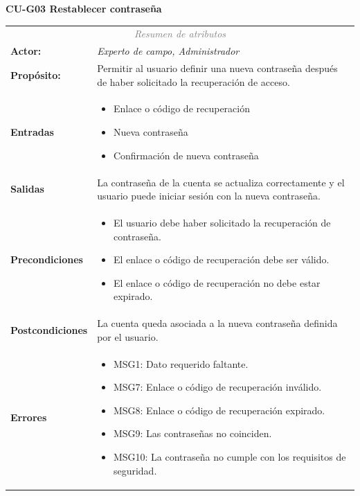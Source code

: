 \textbf{CU-G03 Restablecer contraseña}
\begin{table}[H]
\centering
\renewcommand{\arraystretch}{1.2}

\begin{tabular}{|l|p{10cm}|}
\hline
\rowcolor{black}
\multicolumn{2}{|l|}{\color{white} \textbf{Caso de uso:} CU-G03 Restablecer contraseña} \\ \hline

\multicolumn{2}{|c|}{\textit{\textcolor{gray}{Resumen de atributos}}} \\ \hline

\textbf{Actor:} & \textit{Experto de campo, Administrador} \\ \hline

\textbf{Propósito:} & Permitir al usuario definir una nueva contraseña después de haber solicitado la recuperación de acceso. \\ \hline

\textbf{Entradas} & 
\begin{itemize}
    \item Enlace o código de recuperación
    \item Nueva contraseña
    \item Confirmación de nueva contraseña
\end{itemize} \\ \hline

\textbf{Salidas} & 
La contraseña de la cuenta se actualiza correctamente y el usuario puede iniciar sesión con la nueva contraseña. \\ \hline

\textbf{Precondiciones} & 
\begin{itemize}
    \item El usuario debe haber solicitado la recuperación de contraseña.
    \item El enlace o código de recuperación debe ser válido.
    \item El enlace o código de recuperación no debe estar expirado.
\end{itemize} \\ \hline

\textbf{Postcondiciones} & 
La cuenta queda asociada a la nueva contraseña definida por el usuario. \\ \hline

\textbf{Errores} & 
\begin{itemize}
    \item MSG1: Dato requerido faltante.
    \item MSG7: Enlace o código de recuperación inválido.
    \item MSG8: Enlace o código de recuperación expirado.
    \item MSG9: Las contraseñas no coinciden.
    \item MSG10: La contraseña no cumple con los requisitos de seguridad.
\end{itemize} \\ \hline


\end{tabular}
\end{table}
